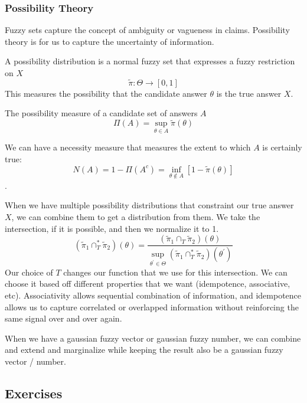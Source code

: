 \documentclass[11pt]{article}
\begin{document}
\subsubsection{Possibility Theory}
Fuzzy sets capture the concept of ambiguity or vagueness in claims.
Possibility theory is for us to capture the uncertainty of information.

A possibility distribution is a normal fuzzy set that expresses a fuzzy restriction on $X$
\begin{equation}
    \tilde{\pi} : \Theta \to [0,1]
\end{equation}
This measures the possibility that the candidate answer $\theta$ is the true answer $X$.

The possibility measure of a candidate set of answers $A$
\begin{equation}
    \Pi(A) = \sup_{\theta \in A} \tilde{\pi} (\theta)
\end{equation}

We can have a necessity measure that measures the extent to which $A$ is certainly true:
\begin{equation}
    N(A) = 1 - \Pi(A^c) = \inf_{\theta \notin A} [1-\tilde{\pi}(\theta)]
\end{equation}.

When we have multiple possibility distributions that constraint our true answer $X$, we can combine them to get a distribution from them.
We take the intersection, if it is possible, and then we normalize it to 1.
\begin{equation}
    (\tilde{\pi}_1 \cap_T^* \tilde{\pi}_2)(\theta) = \frac{(\tilde{\pi}_1 \cap_T \tilde{\pi}_2)(\theta)}{\sup_{\theta^\prime \in \Theta}(\tilde{\pi}_1 \cap_T^* \tilde{\pi}_2)(\theta^\prime)}
\end{equation}
Our choice of $T$ changes our function that we use for this intersection.
We can choose it based off different properties that we want (idempotence, associative, etc).
Associativity allows sequential combination of information, and idempotence allows us to capture correlated or overlapped information without reinforcing the same signal over and over again.

When we have a gaussian fuzzy vector or gaussian fuzzy number, we can combine and extend and marginalize while keeping the result also be a gaussian fuzzy vector / number.

\subsection{Exercises}
\end{document}
